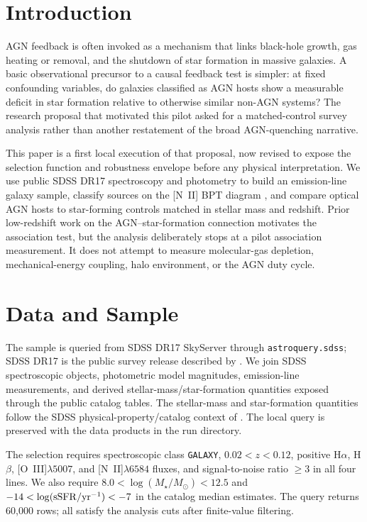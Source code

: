 \documentclass[twocolumn]{aastex631}
\begin{document}

\section{Introduction}\label{sec:intro}
AGN feedback is often invoked as a mechanism that links black-hole growth, gas heating or removal, and the shutdown of star formation in massive galaxies.  A basic observational precursor to a causal feedback test is simpler: at fixed confounding variables, do galaxies classified as AGN hosts show a measurable deficit in star formation relative to otherwise similar non-AGN systems?  The research proposal that motivated this pilot asked for a matched-control survey analysis rather than another restatement of the broad AGN-quenching narrative.

This paper is a first local execution of that proposal, now revised to expose the selection function and robustness envelope before any physical interpretation.  We use public SDSS DR17 spectroscopy and photometry \citep{abdurrouf2022} to build an emission-line galaxy sample, classify sources on the [N~II] BPT diagram \citep{baldwin1981,kewley2001,kauffmann2003,kewley2006}, and compare optical AGN hosts to star-forming controls matched in stellar mass and redshift.  Prior low-redshift work on the AGN--star-formation connection \citep{lamassa2013} motivates the association test, but the analysis deliberately stops at a pilot association measurement.  It does not attempt to measure molecular-gas depletion, mechanical-energy coupling, halo environment, or the AGN duty cycle.

\section{Data and Sample}\label{sec:data}
The sample is queried from SDSS DR17 SkyServer through \texttt{astroquery.sdss}; SDSS DR17 is the public survey release described by \citet{abdurrouf2022}.  We join SDSS spectroscopic objects, photometric model magnitudes, emission-line measurements, and derived stellar-mass/star-formation quantities exposed through the public catalog tables.  The stellar-mass and star-formation quantities follow the SDSS physical-property/catalog context of \citet{brinchmann2004}.  The local query is preserved with the data products in the run directory.

The selection requires spectroscopic class \texttt{GALAXY}, $0.02<z<0.12$, positive H$\alpha$, H$\beta$, [O~III]$\lambda5007$, and [N~II]$\lambda6584$ fluxes, and signal-to-noise ratio $\geq3$ in all four lines.  We also require $8.0 < \log(M_\star/M_\odot) < 12.5$ and $-14 < \log({\rm sSFR}/{\rm yr}^{-1}) < -7$ in the catalog median estimates.  The query returns 60,000 rows; all satisfy the analysis cuts after finite-value filtering.
\end{document}
